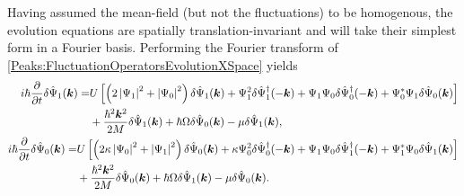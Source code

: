 Having assumed the mean-field (but not the fluctuations) to be homogenous, the evolution equations are spatially translation-invariant and will take their simplest form in a Fourier basis. Performing the Fourier transform of \eqref{Peaks:FluctuationOperatorsEvolutionXSpace} yields
\begin{subequations}
    \label{Peaks:FluctuationOperatorsEvolutionKSpace}
    \begin{align}
        \begin{split}
            i \hbar \frac{\partial }{\partial t}\delta \hat{\Psi}_1(\vect{k}) =& U\left[ \left(2\abs{\Psi_1}^2+\abs{\Psi_0}^2 \right)\delta \hat{\Psi}_1(\vect{k}) + \Psi_1^2\delta\hat{\Psi}_1^\dagger(-\vect{k}) + \Psi_1\Psi_0\delta\hat{\Psi}_0^\dagger(-\vect{k}) + \Psi_0^*\Psi_1\delta\hat{\Psi}_0(\vect{k})\right]\\
                    & +\frac{\hbar^2 \vect{k}^2}{2M} \delta \hat{\Psi}_1(\vect{k}) +\hbar \Omega\delta\hat{\Psi}_0(\vect{k})- \mu \delta \hat{\Psi}_1(\vect{k}),
        \end{split}\\
        \begin{split}
        i \hbar \frac{\partial}{\partial t} \delta \hat{\Psi}_0(\vect{k}) =& U\left[\left(2\kappa \abs{\Psi_0}^2 +\abs{\Psi_1}^2\right)\delta\hat{\Psi}_0(\vect{k}) + \kappa \Psi_0^2 \delta\hat{\Psi}_0^\dagger(-\vect{k}) + \Psi_1\Psi_0\delta\hat{\Psi}_1^\dagger(-\vect{k}) + \Psi_1^*\Psi_0\delta\hat{\Psi}_1(\vect{k})\right]\\
                    & +\frac{\hbar^2 \vect{k}^2}{2M} \delta \hat{\Psi}_0(\vect{k}) +\hbar \Omega\delta\hat{\Psi}_1(\vect{k}) - \mu \delta\hat{\Psi}_0(\vect{k}).
        \end{split}
    \end{align}
\end{subequations}

